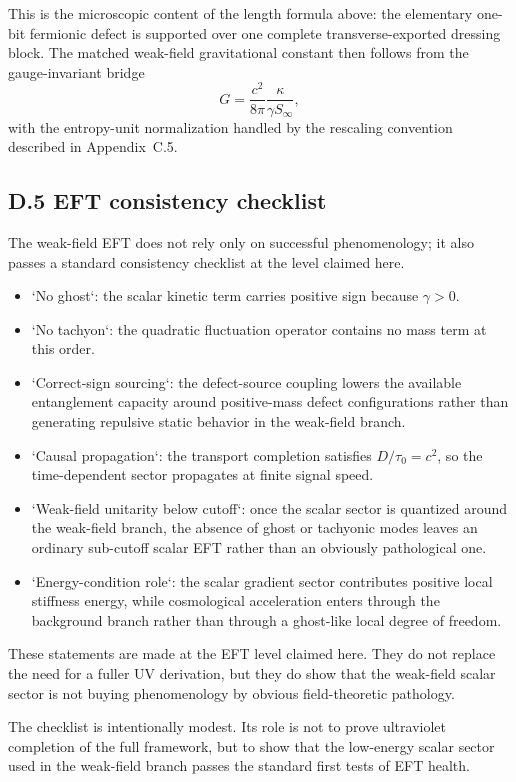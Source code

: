 \documentclass[11pt]{article}
\begin{document}
This is the microscopic content of the length formula above: the elementary one-bit fermionic defect is supported over one complete transverse-exported dressing block. The matched weak-field gravitational constant then follows from the gauge-invariant bridge
\[
G=\frac{c^2}{8\pi}\frac{\kappa}{\gamma S_\infty},
\]
with the entropy-unit normalization handled by the rescaling convention described in Appendix~C.5.

\subsection*{D.5 EFT consistency checklist}

The weak-field EFT does not rely only on successful phenomenology; it also passes a standard consistency checklist at the level claimed here.
\begin{itemize}
\item `No ghost`: the scalar kinetic term carries positive sign because $\gamma>0$.
\item `No tachyon`: the quadratic fluctuation operator contains no mass term at this order.
\item `Correct-sign sourcing`: the defect-source coupling lowers the available entanglement capacity around positive-mass defect configurations rather than generating repulsive static behavior in the weak-field branch.
\item `Causal propagation`: the transport completion satisfies $D/\tau_0=c^2$, so the time-dependent sector propagates at finite signal speed.
\item `Weak-field unitarity below cutoff`: once the scalar sector is quantized around the weak-field branch, the absence of ghost or tachyonic modes leaves an ordinary sub-cutoff scalar EFT rather than an obviously pathological one.
\item `Energy-condition role`: the scalar gradient sector contributes positive local stiffness energy, while cosmological acceleration enters through the background branch rather than through a ghost-like local degree of freedom.
\end{itemize}
These statements are made at the EFT level claimed here. They do not replace the need for a fuller UV derivation, but they do show that the weak-field scalar sector is not buying phenomenology by obvious field-theoretic pathology.

The checklist is intentionally modest. Its role is not to prove ultraviolet completion of the full framework, but to show that the low-energy scalar sector used in the weak-field branch passes the standard first tests of EFT health.
\end{document}
